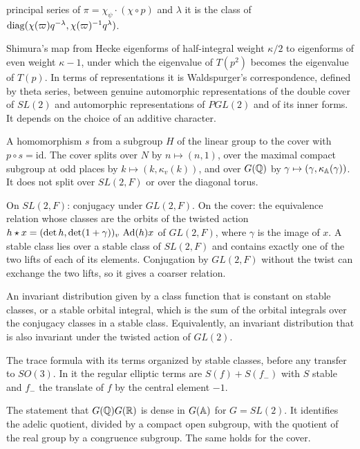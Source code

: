 \begin{description}
  principal series of $\pi=\chi_\psi\cdot(\chi\circ p)$ and $\lambda$ it
  is the class of $\operatorname{diag}(\chi(\varpi)q^{-\lambda},\chi(\varpi)^{-1}
  q^{\lambda})$.
\item[Shimura correspondence.] Shimura's map from Hecke eigenforms of
  half-integral weight $\kappa/2$ to eigenforms of even weight
  $\kappa-1$, under which the eigenvalue of $T(p^2)$ becomes the
  eigenvalue of $T(p)$. In terms of representations it is Waldspurger's
  correspondence, defined by theta series, between genuine automorphic
  representations of the double cover of $SL(2)$ and automorphic
  representations of $PGL(2)$ and of its inner forms. It depends on the
  choice of an additive character.
\item[Splitting.] A homomorphism $s$ from a subgroup $H$ of the linear
  group to the cover with $p\circ s=\mathrm{id}$. The cover splits over
  $N$ by $n\mapsto(n,1)$, over the maximal compact subgroup at odd places
  by $k\mapsto(k,\kappa_v(k))$, and over $G(\mathbb{Q})$ by $\gamma\mapsto(\gamma,
  \kappa_{\mathbb{A}}(\gamma))$. It does not split over $SL(2,F)$ or over the
  diagonal torus.
\item[Stable conjugacy.] On $SL(2,F)$: conjugacy under $GL(2,F)$. On the
  cover: the equivalence relation whose classes are the orbits of the
  twisted action $h\star x=(\det h,\det(1+\gamma))_v\,\operatorname{Ad}(h)x$ of
  $GL(2,F)$, where $\gamma$ is the image of $x$. A stable class lies over
  a stable class of $SL(2,F)$ and contains exactly one of the two lifts
  of each of its elements. Conjugation by $GL(2,F)$ without the twist can
  exchange the two lifts, so it gives a coarser relation.
\item[Stable distribution.] An invariant distribution given by a class
  function that is constant on stable classes, or a stable orbital
  integral, which is the sum of the orbital integrals over the conjugacy
  classes in a stable class. Equivalently, an invariant distribution
  that is also invariant under the twisted action of $GL(2)$.
\item[Stable(r) form.] The trace formula with its terms organized by
  stable classes, before any transfer to $SO(3)$. In it the regular
  elliptic terms are $S(f)+S(f_-)$ with $S$ stable and $f_-$ the
  translate of $f$ by the central element $-1$.
\item[Strong approximation.] The statement that $G(\mathbb{Q})G(\mathbb{R})$ is dense in
  $G(\mathbb{A})$ for $G=SL(2)$. It identifies the adelic quotient, divided by a
  compact open subgroup, with the quotient of the real group by a
  congruence subgroup. The same holds for the cover.

\end{description}
